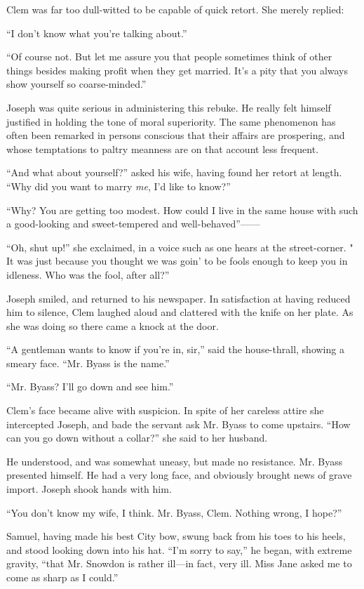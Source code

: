 Clem was far too dull-witted to be capable of quick retort. She merely
replied:

``I don't know what you're talking about.''

``Of course not. But let me assure you that people sometimes think of
other things besides making profit when they get married. It's a pity
that you always show yourself so coarse-minded.''

Joseph was quite serious in administering this rebuke. He really felt
himself justified in holding the tone of moral superiority. The same
phenomenon has often been remarked in persons conscious that their
affairs are prospering, and whose temptations to paltry meanness are on
that account less frequent.

{}``And what about yourself?'' asked his wife, having found her retort
at length. ``Why did you want to marry \emph{me}, I'd like to know?''

``Why? You are getting too modest. How could I live in the same house
with such a good-looking and sweet-tempered and well-behaved''{{------}}

``Oh, shut up!'' she exclaimed, in a voice such as one hears at the
street-corner. " It was just because you thought we was goin' to be
fools enough to keep you in idleness. Who was the fool, after all?''

Joseph smiled, and returned to his newspaper. In satisfaction at having
reduced him to silence, Clem laughed aloud and clattered with the knife
on her plate. As she was doing so there came a knock at the door.

``A gentleman wants to know if you're in, sir,'' said the house-thrall,
showing a smeary face. ``Mr. Byass is the name.''

``Mr. Byass? I'll go down and see him.''

Clem's face became alive with suspicion. In spite of her careless attire
she intercepted Joseph, and bade the servant ask Mr. Byass to come
upstairs. ``How can you go down without a collar?'' she said to her
husband.

{}He understood, and was somewhat uneasy, but made no resistance. Mr.
Byass presented himself. He had a very long face, and obviously brought
news of grave import. Joseph shook hands with him.

``You don't know my wife, I think. Mr. Byass, Clem. Nothing wrong, I
hope?''

Samuel, having made his best City bow, swung back from his toes to his
heels, and stood looking down into his hat. ``I'm sorry to say,'' he
began, with extreme gravity, ``that Mr. Snowdon is rather ill---in fact,
very ill. Miss Jane asked me to come as sharp as I could.''

